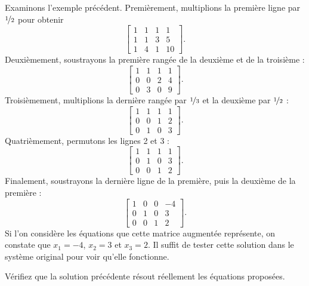 Examinons l'exemple précédent. Premièrement, multiplions la première ligne par
$\nicefrac{1}{2}$ pour obtenir
\begin{equation*}
\left[
\begin{array}{ccc|c}
1 & 1 & 1 & 1 \\
1 & 1 & 3 & 5 \\
1 & 4 & 1 & 10
\end{array}
\right] .
\end{equation*}
Deuxièmement, soustrayons la première rangée de la deuxième et de la troisième :
\begin{equation*}
\left[
\begin{array}{ccc|c}
1 & 1 & 1 & 1 \\
0 & 0 & 2 & 4 \\
0 & 3 & 0 & 9
\end{array}
\right].
\end{equation*}
Troisièmement, multiplions la dernière rangée par $\nicefrac{1}{3}$ et la deuxième par $\nicefrac{1}{2}$ :
\begin{equation*}
\left[
\begin{array}{ccc|c}
1 & 1 & 1 & 1 \\
0 & 0 & 1 & 2 \\
0 & 1 & 0 & 3
\end{array}
\right].
\end{equation*}
Quatrièmement, permutons les lignes 2 et 3 :
\begin{equation*}
\left[
\begin{array}{ccc|c}
1 & 1 & 1 & 1 \\
0 & 1 & 0 & 3 \\
0 & 0 & 1 & 2
\end{array}
\right].
\end{equation*}
Finalement, soustrayons la dernière ligne de la première, puis la deuxième de la première :
\begin{equation*}
\left[
\begin{array}{ccc|c}
1 & 0 & 0 & -4 \\
0 & 1 & 0 & 3 \\
0 & 0 & 1 & 2
\end{array}
\right].
\end{equation*}
Si l'on considère les équations que cette matrice augmentée représente, on constate que
$x_1 = -4$, $x_2 = 3$ et $x_3 = 2$. Il suffit de tester cette solution dans le système original pour voir qu'elle fonctionne.

\begin{exercise}
Vérifiez que la solution précédente résout réellement les équations proposées.
\end{exercise}


